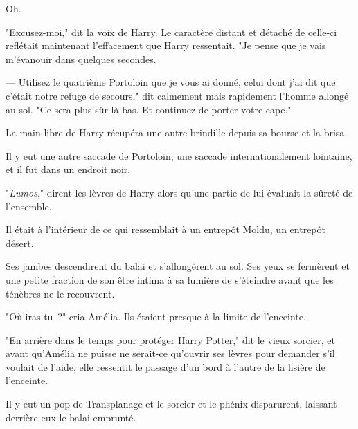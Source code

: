 Oh.

"Excusez-moi," dit la voix de Harry. Le caractère distant et détaché de celle-ci reflétait maintenant l'effacement que Harry ressentait. "Je pense que je vais m'évanouir dans quelques secondes.

--- Utilisez le quatrième Portoloin que je vous ai donné, celui dont j'ai dit que c'était notre refuge de secours," dit calmement mais rapidement l'homme allongé au sol. "Ce sera plus sûr là-bas. Et continuez de porter votre cape."

La main libre de Harry récupéra une autre brindille depuis sa bourse et la brisa.

Il y eut une autre saccade de Portoloin, une saccade internationalement lointaine, et il fut dans un endroit noir.

"\emph{Lumos}," dirent les lèvres de Harry alors qu'une partie de lui évaluait la sûreté de l'ensemble.

Il était à l'intérieur de ce qui ressemblait à un entrepôt Moldu, un entrepôt désert.

Ses jambes descendirent du balai et s'allongèrent au sol. Ses yeux se fermèrent et une petite fraction de son être intima à sa lumière de s'éteindre avant que les ténèbres ne le recouvrent.

\later

"Où iras-tu~?" cria Amélia. Ils étaient presque à la limite de l'enceinte.

"En arrière dans le temps pour protéger Harry Potter," dit le vieux sorcier, et avant qu'Amélia ne puisse ne serait-ce qu'ouvrir ses lèvres pour demander s'il voulait de l'aide, elle ressentit le passage d'un bord à l'autre de la lisière de l'enceinte.

Il y eut un pop de Transplanage et le sorcier et le phénix disparurent, laissant derrière eux le balai emprunté. 

